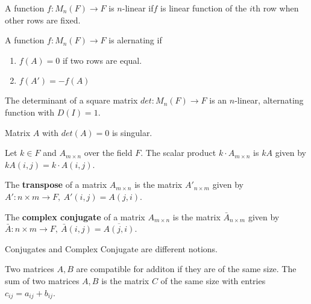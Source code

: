 \begin{definition}[$n$-linear]
	A function $f : M_n(F) \to F$ is $n$-linear if$f$ is linear function of the $i$th row when other rows are fixed.
\end{definition}

\begin{definition}[alternating]
	A function $f : M_n(F) \to F$ is alernating if
	\begin{enumerate}
		\item $f(A) = 0$  if two rows are equal.
		\item $f(A') = -f(A)$
	\end{enumerate}
\end{definition}

\begin{definition}[determinant]
	The determinant of a square matrix $det : M_n(F) \to F$ is an $n$-linear, alternating function with $D(I) = 1$.
\end{definition}
\begin{note}
	Matrix $A$ with $det(A) = 0$ is singular.
\end{note}

\begin{definition}
	Let $k \in F$ and $A_{m \times n}$ over the field $F$.
	The scalar product $k \cdot A_{m \times n}$ is $kA$ given by $kA(i,j) = k \cdot A(i,j)$.
\end{definition}

\begin{definition}[transposition]
	The \textbf{transpose} of a matrix $A_{m \times n}$ is the matrix $A'_{n \times m}$ given by $A' : n \times m \to F,\ A'(i,j) = A(j,i)$.
\end{definition}

\begin{definition}
	The \textbf{complex conjugate} of a matrix $A_{m \times n}$ is the matrix $\bar{A}_{n \times m}$ given by $\bar{A} : n \times m \to F,\ \bar{A}(i,j) = \overline{A(j,i)}$.
\end{definition}
\begin{note}
	Conjugates and Complex Conjugate are different notions.
\end{note}

\begin{definition}[addition]
	Two matrices $A,B$ are compatible for additon if they are of the same size.
	The sum of two matrices $A,B$ is the matrix $C$ of the same size with entries $c_{ij} = a_{ij} + b_{ij}$.
\end{definition}

